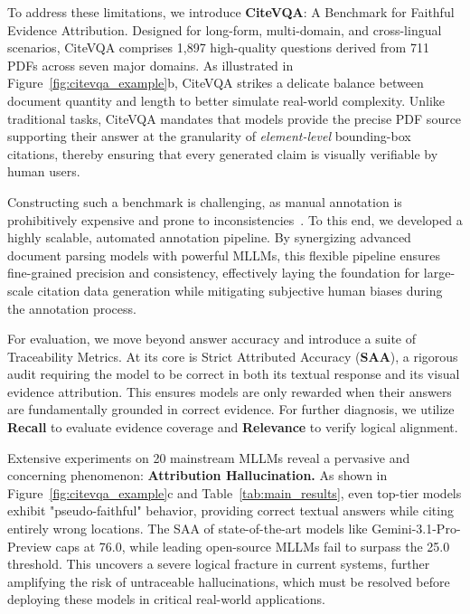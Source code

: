 \documentclass[]{opendatalab}
\begin{document}
To address these limitations, we introduce \textbf{CiteVQA}: A Benchmark for Faithful Evidence Attribution. Designed for long-form, multi-domain, and cross-lingual scenarios, CiteVQA comprises 1,897 high-quality questions derived from 711 PDFs across seven major domains. As illustrated in Figure~\ref{fig:citevqa_example}b, CiteVQA strikes a delicate balance between document quantity and length to better simulate real-world complexity. Unlike traditional tasks, CiteVQA mandates that models provide the precise PDF source supporting their answer at the granularity of \textit{element-level} bounding-box citations, thereby ensuring that every generated claim is visually verifiable by human users.

Constructing such a benchmark is challenging, as manual annotation is prohibitively expensive and prone to inconsistencies~\citep{loison2026vidore}. To this end, we developed a highly scalable, automated annotation pipeline. By synergizing advanced document parsing models with powerful MLLMs, this flexible pipeline ensures fine-grained precision and consistency, effectively laying the foundation for large-scale citation data generation while mitigating subjective human biases during the annotation process.

For evaluation, we move beyond answer accuracy and introduce a suite of Traceability Metrics. At its core is Strict Attributed Accuracy (\textbf{SAA}), a rigorous audit requiring the model to be correct in both its textual response and its visual evidence attribution. This ensures models are only rewarded when their answers are fundamentally grounded in correct evidence. For further diagnosis, we utilize \textbf{Recall} to evaluate evidence coverage and \textbf{Relevance} to verify logical alignment.

Extensive experiments on 20 mainstream MLLMs reveal a pervasive and concerning phenomenon: \textbf{Attribution Hallucination.} As shown in Figure~\ref{fig:citevqa_example}c and Table~\ref{tab:main_results}, even top-tier models exhibit "pseudo-faithful" behavior, providing correct textual answers while citing entirely wrong locations. The SAA of state-of-the-art models like Gemini-3.1-Pro-Preview caps at 76.0, while leading open-source MLLMs fail to surpass the 25.0 threshold. This uncovers a severe logical fracture in current systems, further amplifying the risk of untraceable hallucinations, which must be resolved before deploying these models in critical real-world applications.
\end{document}

